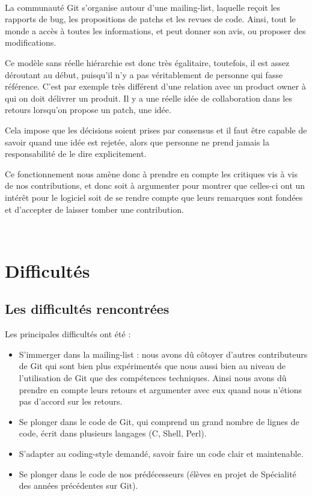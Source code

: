 \documentclass[a4paper, 12pt]{article}
\begin{document}
~\\

La communauté Git s'organise autour d'une mailing-list, laquelle reçoit les rapports de bug, les propositions de patchs et les revues de code. Ainsi, tout le monde a accès à toutes les informations, et peut donner son avis, ou proposer des modifications.

Ce modèle sans réelle hiérarchie est donc très égalitaire, toutefois, il est assez déroutant au début, puisqu'il n'y a pas véritablement de personne qui fasse référence. C'est par exemple très différent d'une relation avec un product owner à qui on doit délivrer un produit. Il y a une réelle idée de collaboration dans les retours lorsqu'on propose un patch, une idée.

Cela impose que les décisions soient prises par consensus et il faut être capable de savoir quand une idée est rejetée, alors que personne ne prend jamais la responsabilité de le dire explicitement.

Ce fonctionnement nous amène donc à prendre en compte les critiques vis à vis de nos contributions, et donc soit à argumenter pour montrer que celles-ci ont un intérêt pour le logiciel soit de se rendre compte que leurs remarques sont fondées et d'accepter de laisser tomber une contribution.

~\\



\section{Difficultés}

\subsection{Les difficultés rencontrées}

Les principales difficultés ont été :
\begin{itemize}

\item S'immerger dans la mailing-list : nous avons dû côtoyer d'autres contributeurs de Git qui sont bien plus expérimentés que nous aussi bien au niveau de l'utilisation de Git que des compétences techniques. Ainsi nous avons dû prendre en compte leurs retours et argumenter avec eux quand nous n'étions pas d'accord sur les retours.
\item Se plonger dans le code de Git, qui comprend un grand nombre de lignes de code, écrit dans plusieurs langages (C, Shell, Perl).
\item S'adapter au coding-style demandé, savoir faire un code clair et maintenable.
\item Se plonger dans le code de nos prédécesseurs (élèves en projet de Spécialité des années précédentes sur Git).

\end{itemize}
\end{document}
